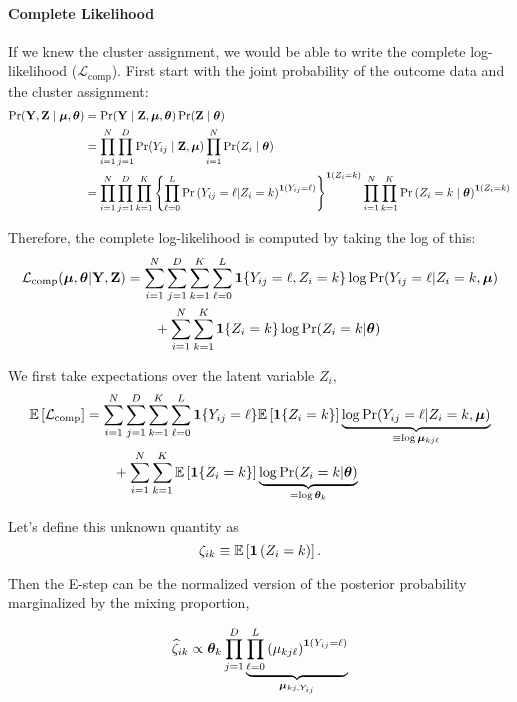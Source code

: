 \documentclass[11pt]{article}
\begin{document}
\paragraph{Complete Likelihood} If we knew the cluster assignment, we would be able to write the complete log-likelihood (\(\mathcal{L}_{\text{comp}}\)). First start with the joint probability of the outcome data and the cluster assignment:
\begin{align}
\Pr(\mathbf{Y}, \mathbf{Z} \mid \bm{\mu}, \bm{\theta}) &= \Pr(\mathbf{Y} \mid \mathbf{Z}, \bm{\mu}, \bm{\theta})\Pr(\mathbf{Z} \mid \bm{\theta})\nonumber\\
&= \prod^{N}_{i=1}\prod^{D}_{j=1}\Pr(Y_{ij} \mid \mathbf{Z}, \bm{\mu}) \prod^N_{i=1}\Pr(Z_i \mid \bm{\theta})\nonumber\\
&= \prod^{N}_{i=1}\prod^{D}_{j=1}\prod^{K}_{k=1}\left\{\prod^{L}_{\ell=0}\mathbb{\Pr}\left(Y_{ij} = \ell | Z_i = k\right)^{\bm{1}\left(Y_{ij} = \ell\right)}\right\}^{\bm{1}\left(Z_i=k\right)} \prod^N_{i=1}\prod^K_{k=1}\mathbb{\Pr}\left(Z_i = {k} \mid \bm{\theta}\right)^{\bm{1}\left(Z_i = k\right)}\nonumber
\end{align}

Therefore, the complete log-likelihood is computed by taking the log of this:
\begin{align}
\mathcal{L}_{\text{comp}}(\bm{\mu}, \bm{\theta}|\mathbf{Y}, \mathbf{Z})
& = \sum^{N}_{i=1}\sum^{D}_{j=1}\sum^{K}_{k=1}\sum^{L}_{\ell = 0}
\bm{1}\{Y_{ij} = \ell, Z_{i} = k\}
\log \Pr(Y_{ij} = \ell | Z_{i} = k, \bm{\mu})\nonumber\\
& \qquad +
\sum^N_{i=1}\sum^{K}_{k=1}\bm{1}\{Z_{i} = k\}\log \Pr(Z_{i} = k | \bm{\theta})
\end{align}

We first take expectations over the latent variable $Z_{i}$,
\begin{align}
\mathbb{E}\left[\mathcal{L}_{\text{comp}}\right]
& = \sum^{N}_{i=1}\sum^{D}_{j=1}\sum^{K}_{k=1}\sum^{L}_{\ell = 0}
\bm{1}\{Y_{ij} = \ell\} \mathbb{E}\left[\bm{1}\{Z_{i} = k\}\right]
\underbrace{\log \Pr(Y_{ij} = \ell | Z_{i} = k, \bm{\mu})}_{\equiv \log\bm{\mu}_{kj\ell}}
\nonumber\\
& \qquad +
\sum^{N}_{i=1}\sum^{K}_{k=1}\mathbb{E}\left[\bm{1}\{Z_{i} = k\}\right]\underbrace{\log \Pr(Z_{i} = k | \bm{\theta})}_{= \log \bm{\theta}_{k}}
\end{align}

 Let's define this unknown quantity as 
\[\zeta_{ik} \equiv \mathbb{E}\left[\bm{1}\left(Z_i = k\right)\right].\]

Then the E-step can be the normalized version of the posterior probability marginalized by the mixing proportion,

\begin{align}
\widehat{\zeta}_{ik} \propto \bm{\theta}_k\prod^D_{j = 1}\underbrace{\prod^{L}_{\ell = 0}\left(\mu_{kj\ell}\right)^{\bm{1}\left(Y_{ij} = \ell\right)}}_{\bm{\mu}_{kj, Y_{ij}}}
\end{align}
\end{document}
